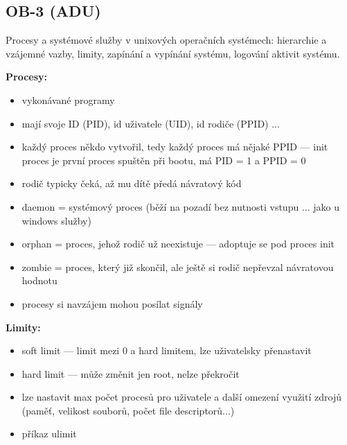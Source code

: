 \subsection{OB-3 (ADU)}
Procesy a systémové služby v unixových operačních systémech: hierarchie a vzájemné vazby, limity, zapínání a vypínání systému, logování aktivit systému.

\textbf{Procesy:}
\begin{itemize}
	\item vykonávané programy
	\item mají svoje ID (PID), id uživatele (UID), id rodiče (PPID) ...
	\item každý proces někdo vytvořil, tedy každý proces má nějaké PPID --- init proces je první proces spuštěn při bootu, má PID = 1 a PPID = 0
	\item rodič typicky čeká, až mu dítě předá návratový kód
	\item daemon = systémový proces (běží na pozadí bez nutnosti vstupu ... jako u windows služby)
	\item orphan = proces, jehož rodič už neexistuje --- adoptuje se pod proces init
	\item zombie = proces, který již skončil, ale ještě si rodič nepřevzal návratovou hodnotu
	\item procesy si navzájem mohou posílat signály
\end{itemize}

\textbf{Limity:}
\begin{itemize}
	\item soft limit --- limit mezi 0 a hard limitem, lze uživatelsky přenastavit
	\item hard limit --- může změnit jen root, nelze překročit
	\item lze nastavit max počet procesů pro uživatele a další omezení využití zdrojů (paměť, velikost souborů, počet file descriptorů...)
	\item příkaz ulimit
\end{itemize}

